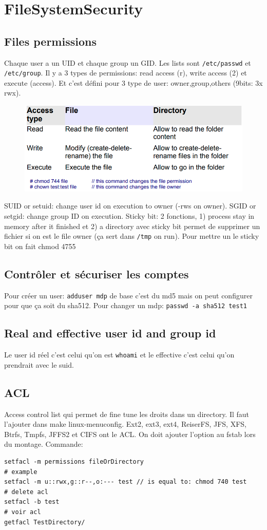\section{FileSystemSecurity}
\subsection{Files permissions}
Chaque user a un UID et chaque group un GID. Les lists sont \verb!/etc/passwd! et \verb!/etc/group!. Il y a 3 types de permissions: read access (r), write access (2) et execute (access). Et c'est défini pour 3 type de user: owner,group,others (9bits: 3x rwx).
\begin{figure}[H]
\centering
\includegraphics[width=0.9\columnwidth]{Figures/security_01.png}
\end{figure}
SUID or setuid: change user id on execution to owner (-rws on owner). SGID or setgid: change group ID on execution. Sticky bit: 2 fonctions, 1) process stay in memory after it finished et 2) a directory avec sticky bit permet de supprimer un fichier si on est le file owner (ça sert dans \verb!/tmp! on run). Pour mettre un le sticky bit on fait chmod 4755

\subsection{Contrôler et sécuriser les comptes}
Pour créer un user: \verb!adduser mdp! de base c'est du md5 mais on peut configurer pour que ça soit du sha512. Pour changer un mdp: \verb!passwd -a sha512 test1!

\subsection{Real and effective user id and group id}
Le user id réel c'est celui qu'on est \verb!whoami! et le effective c'est celui qu'on prendrait avec le suid.

\subsection{ACL}
Access control list qui permet de fine tune les droits dans un directory. Il faut l'ajouter dans make linux-menuconfig. Ext2, ext3, ext4, ReiserFS, JFS, XFS,
Btrfs, Tmpfs, JFFS2 et CIFS ont le ACL. On doit ajouter l'option au fstab lors du montage. Commande:
\begin{Verbatim}[breaklines=true, breakanywhere=true]
setfacl -m permissions fileOrDirectory
# example
setfacl -m u::rwx,g::r--,o:--- test // is equal to: chmod 740 test
# delete acl
setfacl -b test
# voir acl
getfacl TestDirectory/
\end{Verbatim}

